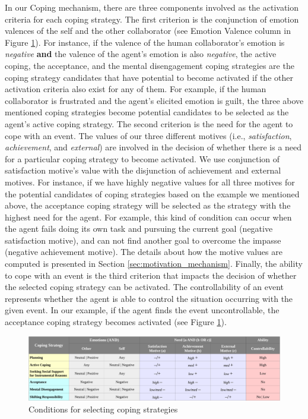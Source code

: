 \documentclass[12pt]{report}
\begin{document}
In our Coping mechanism, there are three components involved as the activation
criteria for each coping strategy. The first criterion is the conjunction of
emotion valences of the self and the other collaborator (see Emotion Valence
column in Figure \ref{fig:coping_strategies}). For instance, if the valence of
the human collaborator's emotion is \textit{negative} \textbf{and} the valence
of the agent's emotion is also \textit{negative}, the active coping, the
acceptance, and the mental disengagement coping strategies are the coping
strategy candidates that have potential to become activated if the other
activation criteria also exist for any of them. For example, if the human
collaborator is frustrated and the agent's elicited emotion is guilt, the three
above mentioned coping strategies become potential candidates to be selected as
the agent's active coping strategy. The second criterion is the need for the
agent to cope with an event. The values of our three different motives (i.e.,
\textit{satisfaction}, \textit{achievement}, and \textit{external}) are involved
in the decision of whether there is a need for a particular coping strategy to
become activated. We use conjunction of satisfaction motive's value with the
disjunction of achievement and external motives. For instance, if we have highly
negative values for all three motives for the potential candidates of coping
strategies based on the example we mentioned above, the acceptance coping
strategy will be selected as the strategy with the highest need for the agent.
For example, this kind of condition can occur when the agent fails doing its own
task and pursuing the current goal (negative satisfaction motive), and can not
find another goal to overcome the impasse (negative achievement motive). The
details about how the motive values are computed is presented in Section
\ref{sec:motivation_mechanism}. Finally, the ability to cope with an event is
the third criterion that impacts the decision of whether the selected coping
strategy can be activated. The controllability of an event represents whether
the agent is able to control the situation occurring with the given event. In
our example, if the agent finds the event uncontrollable, the acceptance coping
strategy becomes activated (see Figure \ref{fig:coping_strategies}).

\begin{figure}
  \centering
  \includegraphics[width=1\textwidth]{figure/coping_algorithms_short_croped.pdf}
  \caption{Conditions for selecting coping strategies}
  \label{fig:coping_strategies}
\end{figure}
\end{document}
